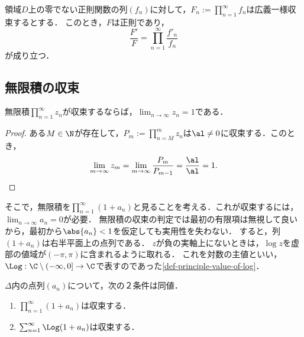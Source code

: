 \documentclass[uplatex, dvipdfmx]{jsreport}
\begin{document}
\begin{lemma}[対数微分]
    領域$D$上の零でない正則関数の列$(f_n)$に対して，$F_n:=\prod^\infty_{n=1}f_n$は広義一様収束するとする．
    このとき，$F$は正則であり，
    \[\frac{F'}{F}=\prod^\infty_{n=1}\frac{f'_n}{f_n}\]
    が成り立つ．
\end{lemma}

\subsection{無限積の収束}

\begin{tcolorbox}[colframe=ForestGreen, colback=ForestGreen!10!white,breakable,colbacktitle=ForestGreen!40!white,coltitle=black,fonttitle=\bfseries\sffamily,
title=]
    
\end{tcolorbox}

\begin{lemma}[無限積の収束に必要な自明な必要条件]
    無限積$\prod_{n=1}^\infty z_n$が収束するならば，$\lim_{n\to\infty}z_n=1$である．
\end{lemma}
\begin{proof}
    ある$M\in\N$が存在して，$P_m:=\prod^m_{n=M}z_n$は$\al\ne0$に収束する．このとき，
    \[\lim_{m\to\infty}z_m=\lim_{m\to\infty}\frac{P_m}{P_{m-1}}=\frac{\al}{\al}=1.\]
\end{proof}

\begin{discussion}
    そこで，無限積を$\prod^\infty_{n=1}(1+a_n)$と見ることを考える．これが収束するには，$\lim_{n\to\infty}a_n=0$が必要．
    無限積の収束の判定では最初の有限項は無視して良いから，最初から$\abs{a_n}<1$を仮定しても実用性を失わない．
    すると，列$(1+a_n)$は右半平面上の点列である．
    $z$が負の実軸上にないときは，$\log z$を虚部の値域が$(-\pi,\pi)$に含まれるように取れる．
    これを対数の主値といい，$\Log:\C\setminus(-\infty,0]\to\C$で表すのであった\ref{def-principle-value-of-log}．
\end{discussion}

\begin{theorem}[無限積が収束することの特徴付け]
    $\Delta$内の点列$(a_n)$について，次の２条件は同値．
    \begin{enumerate}
        \item $\prod^\infty_{n=1}(1+a_n)$は収束する．
        \item $\sum^\infty_{n=1}\Log(1+a_n)$は収束する．
    \end{enumerate}
\end{theorem}
\end{document}
